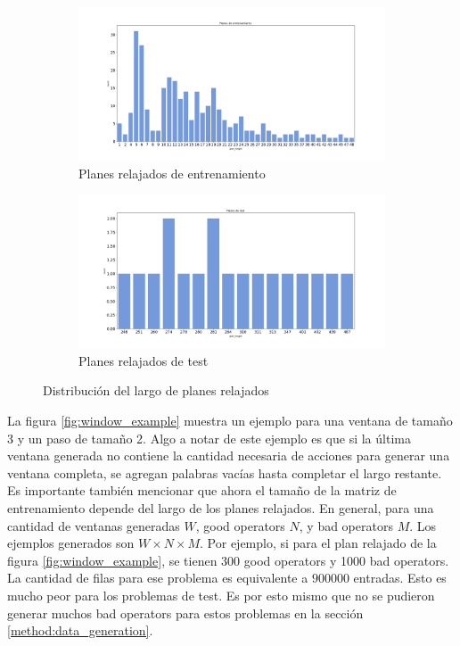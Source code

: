 \begin{figure}[t!]
    \begin{subfigure}[b]{\textwidth}
        \centering
        \includegraphics[width=\linewidth]{figures/plan_length_distplot_train.png}
        \caption{Planes relajados de entrenamiento}
        \label{fig:plan-length-distplot-train}
    \end{subfigure}
    \begin{subfigure}[b]{\textwidth}
        \centering
        \includegraphics[width=\linewidth]{figures/plan_length_distplot_test.png}
        \caption{Planes relajados de test}
        \label{fig:plan-length-distplot-test}
    \end{subfigure}
    \caption{Distribución del largo de planes relajados}
    \label{fig:plan-length-distplot}
\end{figure}

La figura \ref{fig:window_example} muestra un ejemplo para una ventana de tamaño
3 y un paso de tamaño 2. Algo a notar de este ejemplo es que si la última
ventana generada no contiene la cantidad necesaria de acciones para generar una
ventana completa, se agregan palabras vacías hasta completar el largo restante.
Es importante también mencionar que ahora el tamaño de la matriz de entrenamiento
depende del largo de los planes relajados. En general, para una cantidad de
ventanas generadas $W$, good operators $N$, y bad operators $M$. Los ejemplos
generados son $W \times N \times M$. Por ejemplo, si para el plan relajado de la
figura \ref{fig:window_example}, se tienen 300 good operators y 1000 bad
operators. La cantidad de filas para ese problema es equivalente a $900000$
entradas. Esto es mucho peor para los problemas de test. Es por esto mismo que
no se pudieron generar muchos bad operators para estos problemas en la sección
\ref{method:data_generation}.

